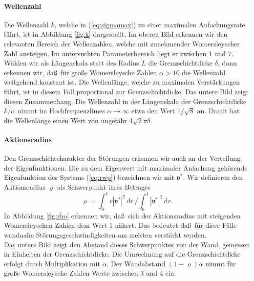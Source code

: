 \documentclass[10pt,a5paper,oneside,draft]{book}
\numberwithin{equation}{chapter}
\begin{document}
\paragraph{Wellenzahl}
Die Wellenzahl $k$, welche in (\mbox{\ref{eq:sigmamax}}) zu einer maximalen Anfachungsrate f\"uhrt, ist in Abbildung \ref{fig:k} dargestellt.
Im oberen Bild erkennen wir den relevanten Bereich der Wellenzahlen, welche mit zunehmender Womersleyscher Zahl ansteigen.
Im untersuchten Parameterbereich liegt er zwischen 1 und 7.\\
W\"ahlen wir als L\"angenskala statt des Radius $L$ die Grenzschichtdicke $\delta$, dann erkennen wir, da\ss\ f\"ur gro\ss e Womersleysche Zahlen $\alpha>10$ die Wellenzahl weitgehend konstant ist.
Die Wellenl\"ange, welche zu maximalen Verst\"arkungen f\"uhrt, ist in diesem Fall proportional zur Grenzschichtdicke.
Das untere Bild zeigt diesen Zusammenhang.
Die Wellenzahl in der L\"angenskala der Grenzschichtdicke $k/\alpha$ nimmt im Hochfrequenzlimes $\alpha\to\infty$ etwa den Wert $1/\sqrt8$ an.
Damit hat die Wellenl\"ange einen Wert von ungef\"ahr $4\sqrt{2}\pi\delta$.\\

\paragraph{Aktionsradius}
Den Grenzschichtcharakter der St\"orungen erkennen wir auch an der Verteilung der Eigenfunktionen.
Die zu dem Eigenwert mit maximaler Anfachung geh\"orende Eigenfunktion des Systems (\mbox{\ref{eq:rwp}}) bezeichnen wir mit $\mathfrak{v}^*$.
Wir definieren den Aktionsradius $\varrho$ als \glqq Schwerpunkt\grqq{} ihres Betrages
\begin{equation}
	\varrho = \int_0^1 r|\mathfrak{v}^*|^2\,\textrm{d}r\,\Big/\int_0^1|\mathfrak{v}^*|^2\,\textrm{d}r.
\end{equation}
In Abbildung \ref{fig:rho} erkennen wir, da\ss\ sich der Aktionsradius mit steigenden Womersleyschen Zahlen dem Wert 1 n\"ahert.
Das bedeutet da\ss\ f\"ur diese F\"alle wandnahe St\"orungsgeschwindigkeiten am meisten verst\"arkt werden.\\
Das untere Bild zeigt den Abstand dieses Schwerpunktes von der Wand, gemessen in Einheiten der Grenzschichtdicke.
Die Umrechnung auf die Grenzschichtdicke erfolgt durch Multiplikation mit $\alpha$.
Der Wandabstand $(1-\varrho)\alpha$ nimmt f\"ur gro\ss e Womersleysche Zahlen Werte zwischen 3 und 4 ein.\\
\end{document}
